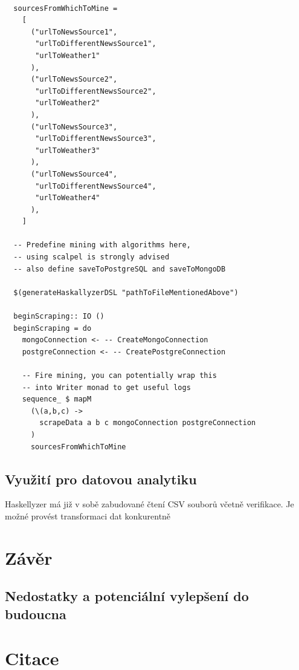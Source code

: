 \documentclass[male,czech]{kithesis}
\begin{document}
\begin{verbatim}

  sourcesFromWhichToMine = 
    [
      ("urlToNewsSource1", 
       "urlToDifferentNewsSource1",
       "urlToWeather1"
      ),
      ("urlToNewsSource2", 
       "urlToDifferentNewsSource2",
       "urlToWeather2"
      ),
      ("urlToNewsSource3", 
       "urlToDifferentNewsSource3",
       "urlToWeather3"
      ),
      ("urlToNewsSource4", 
       "urlToDifferentNewsSource4",
       "urlToWeather4"
      ),
    ]
  
  -- Predefine mining with algorithms here, 
  -- using scalpel is strongly advised
  -- also define saveToPostgreSQL and saveToMongoDB

  $(generateHaskallyzerDSL "pathToFileMentionedAbove")
  
  beginScraping:: IO ()
  beginScraping = do
    mongoConnection <- -- CreateMongoConnection
    postgreConnection <- -- CreatePostgreConnection

    -- Fire mining, you can potentially wrap this 
    -- into Writer monad to get useful logs
    sequence_ $ mapM 
      (\(a,b,c) -> 
        scrapeData a b c mongoConnection postgreConnection
      ) 
      sourcesFromWhichToMine
\end{verbatim}


\section{Využití pro datovou analytiku}

Haskellyzer má již v sobě zabudované čtení CSV souborů včetně verifikace. Je možné provést 
transformaci dat konkurentně 

\chapter{Závěr}

\section{Nedostatky a potenciální vylepšení do budoucna}

\chapter{Citace}


\printbibliography[heading=none]
\appendix
\end{document}
